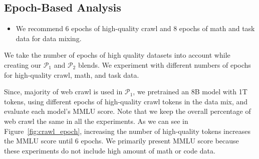 \documentclass[11pt]{article}
\newcommand{\steven}[1]{\textcolor{magenta}{\bf\small [Steven: #1]}\xspace}
\newcommand{\kk}[1]{\textcolor{cyan}{\bf\small [Kezhi: #1]}\xspace}
\newcommand{\phaseone}{$\mathcal{P}_1$\xspace}
\newcommand{\phasetwo}{$\mathcal{P}_2$\xspace}
\begin{document}
\subsection{Epoch-Based Analysis}
\label{subsec:epoch_results}

\begin{tcolorbox}[colframe=black!80, colback=gray!10, coltitle=white, title=Insights, fonttitle=\bfseries]
\begin{itemize}
\item We recommend 6 epochs of high-quality crawl and 8 epochs of math and task data for data mixing.
\end{itemize}
\end{tcolorbox}

We take the number of epochs of high quality datasets into account while creating our \phaseone and \phasetwo blends.
We experiment with different numbers of epochs for high-quality crawl, math, and task data.

Since, majority of web crawl is used in \phaseone, we pretrained an 8B model with 1T tokens, using different epochs of high-quality crawl tokens in the data mix, and evaluate each model's MMLU score. 
Note that we keep the overall percentage of web crawl the same in all the experiments.
As we can see in Figure~\ref{fig:crawl_epoch}, increasing the number of high-quality tokens increases the MMLU score until 6 epochs. 
We primarily present MMLU score because these experiments do not include high amount of math or code data.
\end{document}
